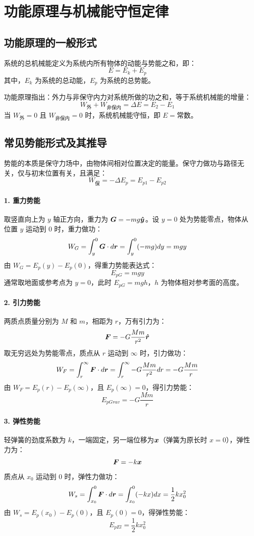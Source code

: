 \section{功能原理与机械能守恒定律}
\subsection{功能原理的一般形式}
系统的总机械能定义为系统内所有物体的动能与势能之和，即：
\[
E = E_k + E_p
\]
其中，\(E_k\) 为系统的总动能，\(E_p\) 为系统的总势能。

功能原理指出：外力与非保守内力对系统所做的功之和，等于系统机械能的增量：
\[
W_{\text{外}} + W_{\text{非保内}} = \Delta E = E_2 - E_1
\]
当 \(W_{\text{外}}=0\) 且 \(W_{\text{非保内}}=0\) 时，系统机械能守恒，即 \(E=\text{常数}\)。

\subsection{常见势能形式及其推导}
势能的本质是保守力场中，由物体间相对位置决定的能量。保守力做功与路径无关，仅与初末位置有关，且满足：
\[
W_{\text{保}} = -\Delta E_p = E_{p1} - E_{p2}
\]

\paragraph{1. 重力势能}
取竖直向上为 \(y\) 轴正方向，重力为 \(\boldsymbol{G}=-mg\boldsymbol{\hat{y}}\)。设 \(y=0\) 处为势能零点，物体从位置 \(y\) 运动到 \(0\) 时，重力做功：
\[
W_G = \int_{y}^{0} \boldsymbol{G} \cdot d\boldsymbol{r} = \int_{y}^{0} (-mg) dy = mgy
\]
由 \(W_G = E_p(y) - E_p(0)\)，得重力势能表达式：
\[
E_{pG} = mgy
\]
通常取地面或参考点为 \(y=0\)，此时 \(E_{pG}=mgh\)，\(h\) 为物体相对参考面的高度。

\paragraph{2. 引力势能}
两质点质量分别为 \(M\) 和 \(m\)，相距为 \(r\)，万有引力为：
\[
\boldsymbol{F} = -G\frac{Mm}{r^2}\boldsymbol{\hat{r}}
\]
取无穷远处为势能零点，质点从 \(r\) 运动到 \(\infty\) 时，引力做功：
\[
W_F = \int_{r}^{\infty} \boldsymbol{F} \cdot d\boldsymbol{r} = \int_{r}^{\infty} -G\frac{Mm}{r^2} dr = -G\frac{Mm}{r}
\]
由 \(W_F = E_p(r) - E_p(\infty)\)，且 \(E_p(\infty)=0\)，得引力势能：
\[
E_{pGrav} = -G\frac{Mm}{r}
\]

\paragraph{3. 弹性势能}
轻弹簧的劲度系数为 \(k\)，一端固定，另一端位移为\(\boldsymbol{x}\)（弹簧为原长时 \(x=0\)），弹性力为：
\[
\boldsymbol{F} = -k\boldsymbol{x}
\]
质点从 \(x_0\) 运动到 \(0\) 时，弹性力做功：
\[
W_s = \int_{x_0}^{0} \boldsymbol{F} \cdot d\boldsymbol{r} = \int_{x_0}^{0} (-kx) dx = \frac{1}{2}kx_0^2
\]
由 \(W_s = E_p(x_0) - E_p(0)\)，且 \(E_p(0)=0\)，得弹性势能：
\[
E_{pEl} = \frac{1}{2}kx_0^2
\]

